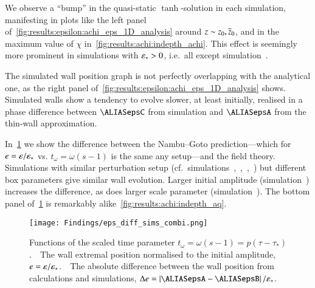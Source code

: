 We observe a ``bump'' in the quasi-static $\tanh$-solution in each simulation, manifesting in plots like the left panel of~\cref{fig:results:epsilon:achi_eps_1D_analysis} around $z\sim z_0,\overline{z}_0$, and in the maximum value of $\chi$ in~\cref{fig:results:achi:indepth_achi}. This effect is seemingly more prominent in simulations with $\varepsilon_\ast >0$, i.e.~all except simulation~. 

The simulated wall position graph is not perfectly overlapping with the analytical one, as the right panel of~\cref{fig:results:epsilon:achi_eps_1D_analysis} shows. Simulated walls show a tendency to evolve slower, at least initially, realised in a phase difference between $\epsC$ from simulation and $\epsA$ from the thin-wall approximation.%


In~\cref{fig:results:epsilon:eps_diff_sims_combi} we show the difference between the Nambu--Goto prediction---which for $e=\varepsilon/\varepsilon_\ast$ vs. $t_\omega=\omega (s-1)$ is the same any setup---and the field theory. Simulations with similar perturbation setup (cf.~simulations~,~,~,~) but different box parameters give similar wall evolution. 
Larger initial amplitude (simulation~) increases the difference, as does larger scale parameter (simulation~). %
The bottom panel of~\cref{fig:results:epsilon:eps_diff_sims_combi} is remarkably alike~\cref{fig:results:achi:indepth_aq}.
\begin{figure}[h]
    \centering
    \texttt{[image: Findings/eps\_diff\_sims\_combi.png]}
    \caption{Functions of the scaled time parameter $t_\omega = \omega (s-1) = p(\tau-\tau_\ast)$.~~The wall extremal position normalised to the initial amplitude, $e=\varepsilon/\varepsilon_\ast$.~~The absolute difference between the wall position from calculations and simulations, $\Delta e = \abs*{\epsA-\epsB}/\epsast$.}
    \label{fig:results:epsilon:eps_diff_sims_combi}
\end{figure}


